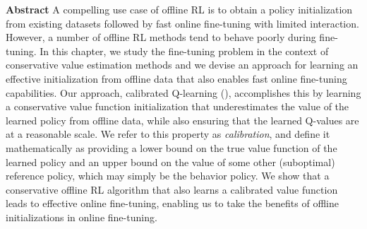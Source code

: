 \documentclass[../thesis.tex]{subfiles}
\begin{document}

\vspace{-0.4cm}
\begin{AIbox}{\large{\textbf{Abstract}}}
\vspace{4mm}
A compelling use case of offline RL is to obtain a policy initialization from existing datasets followed by fast online fine-tuning with limited interaction. However, a number of offline RL methods tend to behave poorly during fine-tuning. In this chapter, we study the fine-tuning problem in the context of conservative value estimation methods and we devise an approach for learning an effective initialization from offline data that also enables fast online fine-tuning capabilities. Our approach, calibrated Q-learning (\methodname), accomplishes this by learning a conservative value function initialization that underestimates the value of the learned policy from offline data, while also ensuring that the learned Q-values are at a reasonable scale. We refer to this property as \emph{calibration}, and define it mathematically as providing a lower bound on the true value function of the learned policy and an upper bound on the value of some other (suboptimal) reference policy, which may simply be the behavior policy. We show that a conservative offline RL algorithm that also learns a calibrated value function leads to effective online fine-tuning, enabling us to take the benefits of offline initializations in online fine-tuning. 
\vspace{2mm}
\end{AIbox}
 









\end{document}
